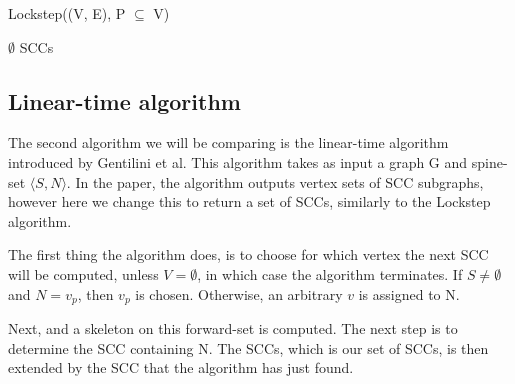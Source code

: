 \documentclass[../master/master.tex]{subfiles}
\begin{document}
\begin{algorithm}
  \caption{Lockstep((V, E), P $\subseteq$ V)}
  \begin{algorithmic}[1]
    \Statex
     \State \Return $\emptyset$
    \EndIf
    \Statex
    \Statex
    \EndWhile
    \Statex
    \Else
    \EndIf
    \Statex
    \EndWhile
    \Statex
    \State \Return SCCs
  \end{algorithmic}
\end{algorithm}

\subsection{Linear-time algorithm}
The second algorithm we will be comparing is the linear-time algorithm \cite{linear} introduced by Gentilini et al. This algorithm takes as input a graph G and spine-set $\langle S, N\rangle$. In the paper, the algorithm outputs vertex sets of SCC subgraphs, however here we change this to return a set of SCCs, similarly to the Lockstep algorithm.

The first thing the algorithm does, is to choose for which vertex the next SCC will be computed, unless $V=\emptyset$, in which case the algorithm terminates. If $S\neq\emptyset$ and $N={v_p}$, then $v_p$ is chosen. Otherwise, an arbitrary $v$ is assigned to N.

Next,  and a skeleton  on this forward-set is computed. The next step is to determine the SCC containing N. The SCCs, which is our set of SCCs, is then extended by the SCC that the algorithm has just found.
\end{document}
